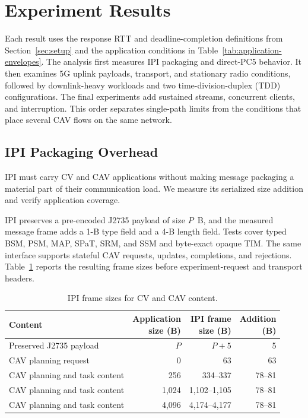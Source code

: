 \section{Experiment Results}
\label{sec:results}

Each result uses the response RTT and deadline-completion definitions from
Section~\ref{sec:setup} and the application conditions in
Table~\ref{tab:application-envelopes}. The analysis first measures IPI
packaging and direct-PC5 behavior. It then examines 5G uplink payloads,
transport, and stationary radio conditions, followed by downlink-heavy
workloads and two time-division-duplex (TDD) configurations. The final
experiments add sustained streams, concurrent clients, and interruption. This
order separates single-path limits from the conditions that place several CAV
flows on the same network.

\subsection{IPI Packaging Overhead}
\label{sec:results-functional}

IPI must carry CV and CAV applications without making message packaging a
material part of their communication load. We measure its serialized size addition and
verify application coverage.

IPI preserves a pre-encoded J2735 payload of size $P$~B, and the measured message
frame adds a 1-B type field and a 4-B length field. Tests cover typed BSM, PSM,
MAP, SPaT, SRM, and SSM and byte-exact opaque TIM. The same interface supports
stateful CAV requests, updates, completions, and rejections.
Table~\ref{tab:ipi-validation} reports the resulting frame sizes before
experiment-request and transport headers.

\begin{table}[t]
  \caption{IPI frame sizes for CV and CAV content.}
  \label{tab:ipi-validation}
  \centering
  \scriptsize
  \setlength{\tabcolsep}{2.4pt}
  \begin{tabular}{@{}p{}rrr@{}}
    \toprule
    Content & \shortstack{Application\\size (B)} & \shortstack{IPI frame\\size (B)} & \shortstack{Addition\\(B)} \\
    \midrule
    Preserved J2735 payload & $P$ & $P+5$ & 5 \\
    CAV planning request & 0 & 63 & 63 \\
    CAV planning and task content & 256 & 334--337 & 78--81 \\
    CAV planning and task content & 1,024 & 1,102--1,105 & 78--81 \\
    CAV planning and task content & 4,096 & 4,174--4,177 & 78--81 \\
    \bottomrule
  \end{tabular}
\end{table}


